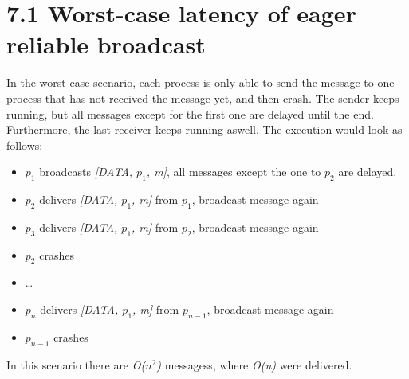 \documentclass{article}
\begin{document}
	\pagestyle{fancy}
	
    \section*{7.1 Worst-case latency of eager reliable broadcast}
    In the worst case scenario, each process is only able to send the message to one process that has not received the message yet, and then crash.
    The sender keeps running, but all messages except for the first one are delayed until the end.
    Furthermore, the last receiver keeps running aswell.
    The execution would look as follows:
    \begin{itemize}
        \item $p_1$ broadcasts \textit{[DATA, $p_1$, m]}, all messages except the one to $p_2$ are delayed.
        \item $p_2$ delivers \textit{[DATA, $p_1$, m]} from $p_1$, broadcast message again
        \item $p_3$ delivers \textit{[DATA, $p_1$, m]} from $p_2$, broadcast message again
        \item $p_2$ crashes
        \item \dots
        \item $p_n$ delivers \textit{[DATA, $p_1$, m]} from $p_{n-1}$, broadcast message again
        \item $p_{n-1}$ crashes
    \end{itemize}
    In this scenario there are \textit{O($n^2$)} messagess, where \textit{O(n)} were delivered.
\end{document}
